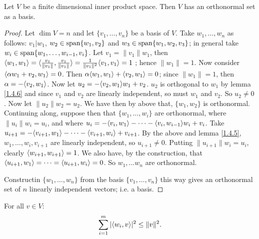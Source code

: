 \begin{theorem}\label{1.4.7}
    Let $V$ be a finite dimensional inner product space. Then  $V$ has an orthonormal set as a
    basis.
\end{theorem}
\begin{proof}
    Let $\dim{V}=n$ and let $\{v_1, \dots, v_n\}$ be a basis of $V$. Take  $w_1 ,\dots, w_n$ as
    follows: $v_1|w_1$, $w_2 \in \operatorname{span}\{w_1,v_2\}$ and $w_3 \in \operatorname{span}\{w_1,w_2,v_3\}$; in general
    take $w_i \in \operatorname{span}\{w_1, \dots, w_{i-1},v_i\}$. Let $v_1=\|v_1\|w_1$, then
    $\langle w_1,w_1\rangle=\langle \frac{v_1}{\|v_1\|},\frac{v_1}{\|v_1\|}\rangle=\frac{1}{\|v_1\|^2}\langle v_1,v_1\rangle=1$
    ; hence $\|w_1\|=1$. Now consider $\langle \alpha w_1+v_2,w_1\rangle=0$. Then
    $\alpha\langle w_1,w_1\rangle+\langle v_2,w_1\rangle=0$; since $\|w_1\|=1$, then $\alpha=-\langle v_2,w_1\rangle$.
    Now let $u_2=-\langle v_2,w_1\rangle w_1+v_2$. $u_2$ is orthogonal to $w_1$ by lemma \ref{1.4.6} and
    since $v_1$ and $v_2$ are linearly independent, so must $w_1$ and $v_2$. So $u_2 \neq 0$. Now
    let $\|u_2\|w_2=u_2$. We have then by above that, $\{w_1,w_2\}$ is orthonormal. Continuing
    along, suppose then that $\{w_1, \dots, w_i\}$ are orthonormal, where $\|u_i\|w_i=u_i$, and 
    where $u_i=-\langle v_i,w_1\rangle-\dots-\langle v_i,w_{i-1}\rangle w_i+v_i$. Take
    $u_{i+1}=-\langle v_{i+1},w_1\rangle-\dots-\langle v_{i+1},w_i\rangle+v_{i+1}$. By the above and lemma
    \ref{1.4.5}, $w_1 ,\dots, w_i,v_{i+1}$ are linearly independent, so $u_{i+1} \neq 0$. 
    Putting $\|u_{i+1}\|w_i=u_i$, clearly $\langle w_{i+1},w_{i+1}\rangle=1$. We also have, by the
    construction, that $\langle u_{i+1},w_1\rangle=\dots=\langle u_{i+1},w_i\rangle=0$. So $w_1, \dots w_n$ are
    orthonormal.

    Constructin $\{w_1, \dots, w_n\}$ from the basis $\{v_1, \dots, v_n\}$ this way gives an
    orthonormal set of $n$ linearly independent vectors; i.e. a basis.
\end{proof}

\begin{corollary}
    For all $v \in V$:
        \begin{equation}
            \sum_{i=1}^m{|\langle w_i,v\rangle|^2} \leq \|v\|^2.
        \end{equation} 
\end{corollary}

